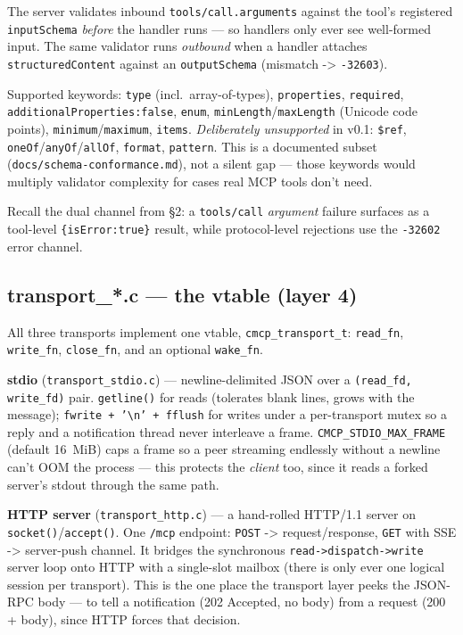 \documentclass[10pt]{article}
\newcommand{\code}[1]{\texttt{\small #1}}
\begin{document}
The server validates inbound \code{tools/call.arguments} against the tool's
registered \code{inputSchema} \emph{before} the handler runs --- so handlers only
ever see well-formed input. The same validator runs \emph{outbound} when a handler
attaches \code{structuredContent} against an \code{outputSchema} (mismatch ->
\code{-32603}).

Supported keywords: \code{type} (incl.\ array-of-types), \code{properties},
\code{required}, \code{additionalProperties:false}, \code{enum},
\code{minLength}/\code{maxLength} (Unicode code points), \code{minimum}/\code{maximum},
\code{items}. \emph{Deliberately unsupported} in v0.1: \code{\$ref},
\code{oneOf}/\code{anyOf}/\code{allOf}, \code{format}, \code{pattern}. This is a
documented subset (\code{docs/schema-conformance.md}), not a silent gap --- those
keywords would multiply validator complexity for cases real MCP tools don't need.

Recall the dual channel from \S2: a \code{tools/call} \emph{argument} failure
surfaces as a tool-level \code{\{isError:true\}} result, while protocol-level
rejections use the \code{-32602} error channel.

\subsection{transport\_*.c --- the vtable (layer 4)}

All three transports implement one vtable, \code{cmcp\_transport\_t}:
\code{read\_fn}, \code{write\_fn}, \code{close\_fn}, and an optional
\code{wake\_fn}.

\textbf{stdio} (\code{transport\_stdio.c}) --- newline-delimited JSON over a
\code{(read\_fd, write\_fd)} pair. \code{getline()} for reads (tolerates blank
lines, grows with the message); \code{fwrite + '\textbackslash n' + fflush} for
writes under a per-transport mutex so a reply and a notification thread never
interleave a frame. \code{CMCP\_STDIO\_MAX\_FRAME} (default 16~MiB) caps a frame
so a peer streaming endlessly without a newline can't OOM the process --- this
protects the \emph{client} too, since it reads a forked server's stdout through
the same path.

\textbf{HTTP server} (\code{transport\_http.c}) --- a hand-rolled HTTP/1.1 server
on \code{socket()}/\code{accept()}. One \code{/mcp} endpoint: \code{POST} ->
request/response, \code{GET} with SSE -> server-push channel. It bridges the
synchronous \code{read->dispatch->write} server loop onto HTTP with a single-slot
mailbox (there is only ever one logical session per transport). This is the one
place the transport layer peeks the JSON-RPC body --- to tell a notification (202
Accepted, no body) from a request (200 + body), since HTTP forces that decision.
\end{document}
